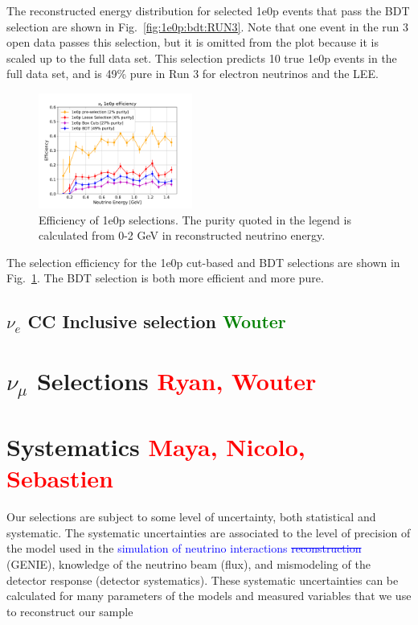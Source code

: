 \documentclass[a4paper]{article}
\begin{document}
The reconstructed energy distribution for selected 1e0p events that pass the BDT selection are shown in Fig.~\ref{fig:1e0p:bdt:RUN3}.  Note that one event in the run 3 open data passes this selection, but it is omitted from the plot because it is scaled up to the full data set.  This selection predicts 10 true 1e0p events in the full data set, and is 49\% pure in Run 3 for electron neutrinos and the LEE.

\begin{figure}[H]
\begin{center}
\includegraphics[width=0.45\textwidth]{1e0p/efficiency_RUN3.pdf}
\caption{\label{fig:1e0p:eff:RUN3} Efficiency of 1e0p selections.  The purity quoted in the legend is calculated from 0-2 GeV in reconstructed neutrino energy.}
\end{center}
\end{figure}

The selection efficiency for the 1e0p cut-based and BDT selections are shown in Fig.~\ref{fig:1e0p:eff:RUN3}.  The BDT selection is both more efficient and more pure. 

\clearpage

\subsection{$\nu_e$ CC Inclusive selection \textcolor{green}{Wouter}}

\clearpage

\section{$\nu_{\mu}$ Selections \textcolor{red}{Ryan, Wouter}}
\label{sec:numuselection}

\clearpage

\section{Systematics \textcolor{red}{Maya, Nicolo, Sebastien}}
\label{sec:systematics}

Our selections are subject to some level of uncertainty, both statistical and systematic. The systematic uncertainties are associated to the level of precision of the model used in the \textcolor{blue}{simulation of neutrino interactions \st{reconstruction}} (GENIE), knowledge of the neutrino beam (flux), and mismodeling of the detector response (detector systematics). These systematic uncertainties can be calculated for many parameters of the models and measured variables that we use to reconstruct our sample
\end{document}
